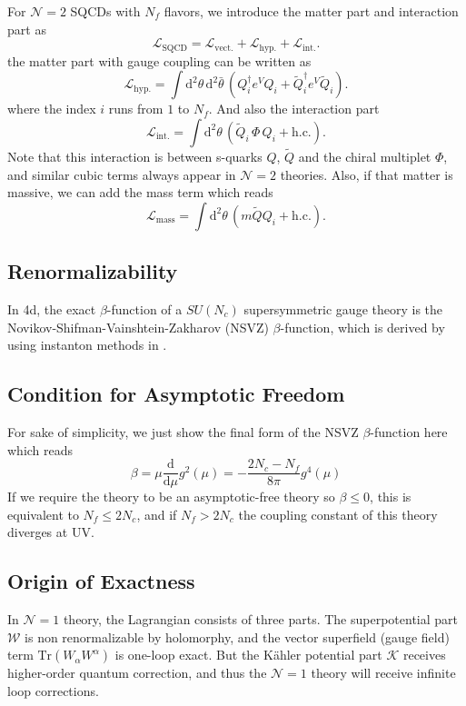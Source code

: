 \documentclass{article}
\begin{document}
For $\mathcal{N}=2$ SQCDs with $N_f$ flavors, we introduce the matter part and interaction part as
\begin{equation}
\mathcal{L}_{\mathrm{SQCD}}=\mathcal{L}_{\mathrm{vect.}}+\mathcal{L}_{\mathrm{hyp.}}+\mathcal{L}_{\mathrm{int.}}.
\end{equation}
the matter part with gauge coupling can be written as
\begin{equation}
\label{eq:superpotential}
\mathcal{L}_{\mathrm{hyp.}}=\int\mathrm{d}^{2} \theta\,\mathrm{d}^{2} \bar{\theta}\,(Q_i^{\dagger}e^{V}Q_i+\tilde{Q}_i^{\dagger}e^{V}\tilde{Q}_i).
\end{equation}
where the index $i$ runs from $1$ to $N_f$. And also the interaction part
\begin{equation}
\mathcal{L}_{\mathrm{int.}}=\int\mathrm{d}^{2} \theta\,(\tilde{Q}_i\,\Phi\,Q_i+\mathrm{h.c.}).
\end{equation}
Note that this interaction is between s-quarks $Q$, $\tilde{Q}$ and the chiral multiplet $\Phi$, and similar cubic terms always appear in $\mathcal{N}=2$ theories. Also, if that matter is massive, we can add the mass term which reads 
\begin{equation}
\mathcal{L}_{\mathrm{mass}}=\int\mathrm{d}^{2} \theta\,(m\tilde{Q}Q_i+\mathrm{h.c.}).
\end{equation}

\subsection{Renormalizability}
In 4d, the exact $\beta$-function of a $SU(N_c)$ supersymmetric gauge theory is the Novikov-Shifman-Vainshtein-Zakharov (NSVZ) $\beta$-function, which is derived by using instanton methods in \cite{NSVZ1,NSVZ2}. 

\subsection{Condition for Asymptotic Freedom}
 For sake of simplicity, we just show the final form of the NSVZ $\beta$-function here which reads 
\begin{equation}
\beta=\mu\frac{\mathrm{d}}{\mathrm{d}\mu}g^2(\mu)=-\frac{2N_c-N_f}{8\pi}g^4(\mu)
\end{equation}
If we require the theory to be an asymptotic-free theory so $\beta \leq 0$, this is equivalent to $N_f \leq 2N_c$, and if $N_f > 2N_c$ the coupling constant of this theory diverges at UV. 

\subsection{Origin of Exactness}
In $\mathcal{N}=1$ theory, the Lagrangian consists of three parts. The superpotential part $\mathcal{W}$ is non renormalizable by holomorphy, and the vector superfield (gauge field) term $\mathrm{Tr}(W_\alpha W^\alpha)$ is one-loop exact. But the K\"{a}hler potential part $\mathcal{K}$ receives higher-order quantum correction, and thus the $\mathcal{N}=1$ theory will receive infinite loop corrections. 
\end{document}
